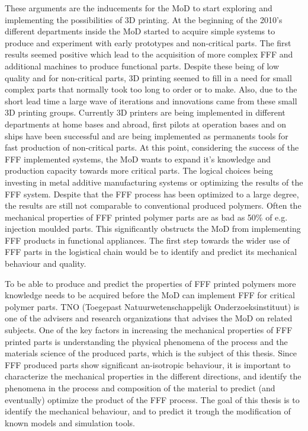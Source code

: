 These arguments are the inducements for the MoD to start exploring and implementing the possibilities of 3D printing. At the beginning of the 2010's different departments inside the MoD started to acquire simple systems to produce and experiment with early prototypes and non-critical parts. The first results seemed positive which lead to the acquisition of more complex FFF and additional machines to produce functional parts. Despite these being of low quality and for non-critical parts, 3D printing seemed to fill in a need for small complex parts that normally took too long to order or to make. Also, due to the short lead time a large wave of iterations and innovations came from these small 3D printing groups. Currently 3D printers are being implemented in different departments at home bases and abroad, first pilots at operation bases and on ships have been successful and are being implemented as permanents tools for fast production of non-critical parts. At this point, considering the success of the FFF implemented systems, the MoD wants to expand it's knowledge and production capacity towards more critical parts. The logical choices being investing in metal additive manufacturing systems or optimizing the results of the FFF system. Despite that the FFF process has been optimized to a large degree, the results are still not comparable to conventional produced polymers. Often the mechanical properties of FFF printed polymer parts are as bad as 50\% of e.g. injection moulded parts. This significantly obstructs the MoD from implementing FFF products in functional appliances. The first step towards the wider use of FFF parts in the logistical chain would be to identify and predict its mechanical behaviour and quality.

To be able to produce and predict the properties of FFF printed polymers more knowledge needs to be acquired before the MoD can implement FFF for critical polymer parts. TNO (Toegepast Natuurwetenschappelijk Onderzoeksinstituut) is one of the advisers and research organizations that advises the MoD on related subjects. One of the key factors in increasing the mechanical properties of FFF printed parts is understanding the physical phenomena of the process and the materials science of the produced parts, which is the subject of this thesis. Since FFF produced parts show significant an-isotropic behaviour, it is important to characterize the mechanical properties in the different directions, and identify the phenomena in the process and composition of the material to predict (and eventually) optimize the product of the FFF process. The goal of this thesis is to identify the mechanical behaviour, and to predict it trough the modification of known models and simulation tools.

